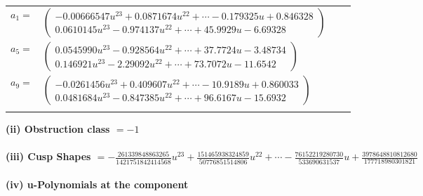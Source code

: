 \documentclass[1p]{elsarticle_modified}
\theoremstyle{definition}
\begin{document}
\begin{tabular}{m{7pt} m{180pt} m{7pt} m{180pt} }
\flushright $a_{1}=$&$\begin{pmatrix}-0.00666547 u^{23}+0.0871674 u^{22}+\cdots-0.179325 u+0.846328\\0.0610145 u^{23}-0.974137 u^{22}+\cdots+45.9929 u-6.69328\end{pmatrix}$ \\
\flushright $a_{5}=$&$\begin{pmatrix}0.0545990 u^{23}-0.928564 u^{22}+\cdots+37.7724 u-3.48734\\0.146921 u^{23}-2.29092 u^{22}+\cdots+73.7072 u-11.6542\end{pmatrix}$ \\
\flushright $a_{9}=$&$\begin{pmatrix}-0.0261456 u^{23}+0.409607 u^{22}+\cdots-10.9189 u+0.860033\\0.0481684 u^{23}-0.847385 u^{22}+\cdots+96.6167 u-15.6932\end{pmatrix}$\\&\end{tabular}
\flushleft \textbf{(ii) Obstruction class $= -1$}\\~\\
\flushleft \textbf{(iii) Cusp Shapes $= -\frac{261339848863265}{1421751842414568} u^{23}+\frac{151465938324859}{50776851514806} u^{22}+\cdots-\frac{76152219280730}{533690631537} u+\frac{3978648810812680}{177718980301821}$}\\~\\
\newpage\renewcommand{\arraystretch}{1}
\flushleft \textbf{(iv) u-Polynomials at the component}\newline \\
\end{document}

